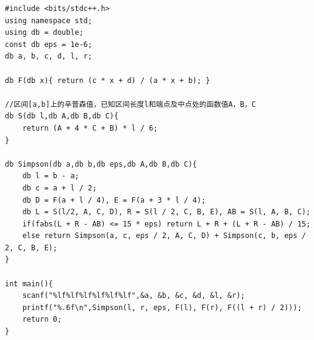 \begin{lstlisting}
#include <bits/stdc++.h>
using namespace std;
using db = double;
const db eps = 1e-6;
db a, b, c, d, l, r;

db F(db x){ return (c * x + d) / (a * x + b); }

//区间[a,b]上的辛普森值，已知区间长度l和端点及中点处的函数值A，B，C
db S(db l,db A,db B,db C){
    return (A + 4 * C + B) * l / 6;
}

db Simpson(db a,db b,db eps,db A,db B,db C){
    db l = b - a;
    db c = a + l / 2;
    db D = F(a + l / 4), E = F(a + 3 * l / 4);
    db L = S(l/2, A, C, D), R = S(l / 2, C, B, E), AB = S(l, A, B, C);
    if(fabs(L + R - AB) <= 15 * eps) return L + R + (L + R - AB) / 15;
    else return Simpson(a, c, eps / 2, A, C, D) + Simpson(c, b, eps / 2, C, B, E);
}

int main(){
    scanf("%lf%lf%lf%lf%lf%lf",&a, &b, &c, &d, &l, &r);
    printf("%.6f\n",Simpson(l, r, eps, F(l), F(r), F((l + r) / 2)));
    return 0;
}
\end{lstlisting}


